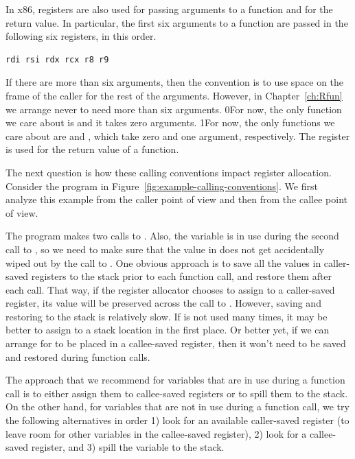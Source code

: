 \documentclass[7x10]{TimesAPriori_MIT}%
\def\racketEd{0}
\def\pythonEd{1}
\def\edition{1}
\newcommand{\racket}[1]{{\if\edition\racketEd{#1}\fi}}
\newcommand{\python}[1]{{\if\edition\pythonEd #1\fi}}
\begin{document}
In x86, registers are also used for passing arguments to a function
and for the return value.  In particular, the first six arguments to a
function are passed in the following six registers, in this order.
\begin{lstlisting}
rdi rsi rdx rcx r8 r9
\end{lstlisting}
If there are more than six arguments, then the convention is to use
space on the frame of the caller for the rest of the
arguments. However, in Chapter~\ref{ch:Rfun} we arrange never to
need more than six arguments.
%
\racket{For now, the only function we care about is 
  and it takes zero arguments.}
%
\python{For now, the only functions we care about are \code{read\_int}
  and \code{print\_int}, which take zero and one argument, respectively.}
%
The register  is used for the return value of a function.

The next question is how these calling conventions impact register
allocation. Consider the \LangVar{} program in
Figure~\ref{fig:example-calling-conventions}.  We first analyze this
example from the caller point of view and then from the callee point
of view.

The program makes two calls to \READOP{}.  Also, the variable 
is in use during the second call to \READOP{}, so we need to make sure
that the value in  does not get accidentally wiped out by the
call to \READOP{}.  One obvious approach is to save all the values in
caller-saved registers to the stack prior to each function call, and
restore them after each call. That way, if the register allocator
chooses to assign  to a caller-saved register, its value will
be preserved across the call to \READOP{}.  However, saving and
restoring to the stack is relatively slow. If  is not used
many times, it may be better to assign  to a stack location in
the first place. Or better yet, if we can arrange for  to be
placed in a callee-saved register, then it won't need to be saved and
restored during function calls.

The approach that we recommend for variables that are in use during a
function call is to either assign them to callee-saved registers or to
spill them to the stack. On the other hand, for variables that are not
in use during a function call, we try the following alternatives in
order 1) look for an available caller-saved register (to leave room
for other variables in the callee-saved register), 2) look for a
callee-saved register, and 3) spill the variable to the stack.
\end{document}

